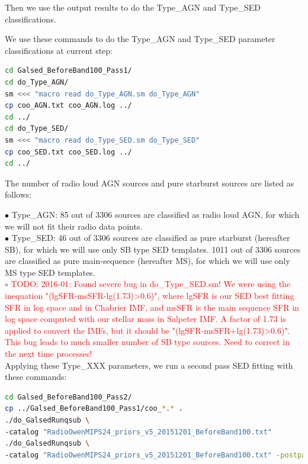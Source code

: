 \documentclass[11pt,a4paper]{article}
\begin{document}
Then we use the output results to do the Type\_AGN and Type\_SED classifications. 

We use these commands to do the Type\_AGN and Type\_SED parameter classifications at current step:

\begin{lstlisting}[language=bash]
cd Galsed_BeforeBand100_Pass1/
cd do_Type_AGN/
sm <<< "macro read do_Type_AGN.sm do_Type_AGN"
cp coo_AGN.txt coo_AGN.log ../
cd ../
cd do_Type_SED/
sm <<< "macro read do_Type_SED.sm do_Type_SED"
cp coo_SED.txt coo_SED.log ../
cd ../
\end{lstlisting}

The number of radio loud AGN sources and pure starburst sources are listed as follows:

\indent\hspace{15pt}$\bullet$ 
Type\_AGN: 85 out of 3306 sources are classified as radio loud AGN, for which we will not fit their radio data points. 
\\
\indent\hspace{15pt}$\bullet$ 
Type\_SED: 46 out of 3306 sources are classified as pure starburst (hereafter SB), for which we will use only SB type SED templates. 1011 out of 3306 sources are classified as pure main-sequence (hereafter MS), for which we will use only MS type SED templates. 
\\
\indent\hspace{15pt}$\circ$ 
\textcolor{red}{TODO: 2016-01: Found severe bug in do\_Type\_SED.sm! We were using the inequation "(lgSFR-msSFR-lg(1.73)>0.6)", where lgSFR is our SED best fitting SFR in log space and in Chabrier IMF, and msSFR is the main sequence SFR in log space computed with our stellar mass in Salpeter IMF. A factor of 1.73 is applied to convert the IMFs, but it should be "(lgSFR-msSFR+lg(1.73)>0.6)". This bug leads to much smaller number of SB type sources. Need to correct in the next time processes!}
\\

Applying these Type\_XXX parameters, we run a second pass SED fitting with these commands:

\begin{lstlisting}[language=bash]
cd Galsed_BeforeBand100_Pass2/
cp ../Galsed_BeforeBand100_Pass1/coo_*.* .
./do_GalsedRunqsub \
-catalog "RadioOwenMIPS24_priors_v5_20151201_BeforeBand100.txt"
./do_GalsedRunqsub \
-catalog "RadioOwenMIPS24_priors_v5_20151201_BeforeBand100.txt" -postparallel
\end{lstlisting}
\end{document}
